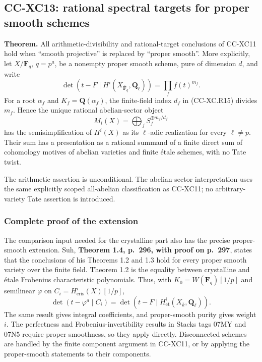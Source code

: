 \subsection{CC-XC13: rational spectral targets for proper smooth
schemes}\label{cc-xc13-rational-spectral-targets-for-proper-smooth-schemes}

\textbf{Theorem.} All arithmetic-divisibility and rational-target
conclusions of CC-XC11 hold when ``smooth projective'' is replaced by
``proper smooth''. More explicitly, let \(X/\mathbf F_q\), \(q=p^a\), be
a nonempty proper smooth scheme, pure of dimension \(d\), and write \[
 \det(t-F\mid H^i(X_{\overline{\mathbf F}_q},
                         \mathbf Q_\ell))
             =\prod_f f(t)^{m_f}.
                                                        \tag{CC-XC.P36}
\] For a root \(\alpha_f\) and \(K_f=\mathbf Q(\alpha_f)\), the
finite-field index \(d_f\) in (CC-XC.R15) divides \(m_f\). Hence the
unique rational abelian-sector object \[
 M_i(X)=\bigoplus_f S_f^{\oplus m_f/d_f}
                                                        \tag{CC-XC.P37}
\] has the semisimplification of \(H^i(X)\) as its \(\ell\)-adic
realization for every \(\ell\ne p\). Their sum has a presentation as a
rational summand of a finite direct sum of cohomology motives of abelian
varieties and finite étale schemes, with no Tate twist.

The arithmetic assertion is unconditional. The abelian-sector
interpretation uses the same explicitly scoped all-abelian
classification as CC-XC11; no arbitrary-variety Tate assertion is
introduced.

\subsubsection{Complete proof of the
extension}\label{complete-proof-of-the-extension}

The comparison input needed for the crystalline part also has the
precise proper-smooth extension. Suh, \textbf{Theorem 1.4, p.~296, with
proof on p.~297}, states that the conclusions of his Theorems 1.2 and
1.3 hold for every proper smooth variety over the finite field. Theorem
1.2 is the equality between crystalline and étale Frobenius
characteristic polynomials. Thus, with \(K_0=W(\mathbf F_q)[1/p]\) and
semilinear \(\varphi\) on \(C_i=H^i_{\mathrm{cris}}(X)[1/p]\), \[
 \det(t-\varphi^a\mid C_i)
     =\det(t-F\mid H^i_{\mathrm{et}}(X_{\bar k},
                                      \mathbf Q_\ell)).
                                                        \tag{CC-XC.P38}
\] The same result gives integral coefficients, and proper-smooth purity
gives weight \(i\). The perfectness and Frobenius-invertibility results
in Stacks tags 07MY and 07N5 require proper smoothness, so they apply
directly. Disconnected schemes are handled by the finite component
argument in CC-XC11, or by applying the proper-smooth statements to
their components.

